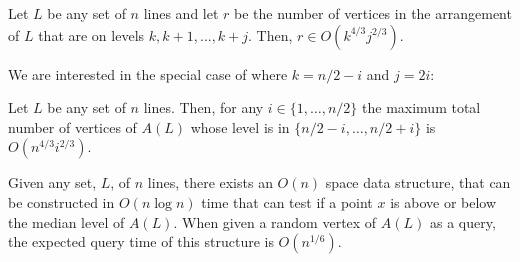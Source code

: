 \documentclass{patmorin}
\begin{document}
\begin{lem}
 Let $L$ be any set of $n$ lines and let $r$ be the number of vertices
 in the arrangement of $L$ that are on levels $k,k+1,\ldots,k+j$.  Then,
 $r \in O(k^{4/3}j^{2/3})$.
\end{lem}

We are interested in the special case of  where $k=n/2-i$
and $j=2i$:

\begin{cor}
  Let $L$ be any set of $n$ lines.  Then, for any $i\in\{1,\ldots,n/2\}$
  the maximum total number of vertices of $A(L)$ whose level is in
  $\{n/2-i,\ldots,n/2+i\}$ is $O(n^{4/3}i^{2/3})$.
\end{cor}

\begin{thm}
  Given any set, $L$, of $n$ lines, there exists an $O(n)$ space data
  structure, that can be constructed in $O(n\log n)$ time that can test
  if a point $x$ is above or below the median level of $A(L)$.  When given
  a random vertex of $A(L)$ as a query, the expected query time of this
  structure is $O(n^{1/6})$.
\end{thm}
\end{document}
